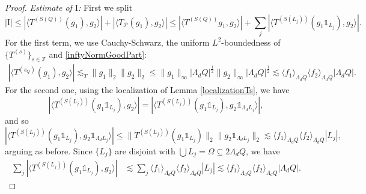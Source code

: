 \documentclass[12pt]{amsart}
\newcommand{\Z}{\mathbb{Z}}
\newcommand{\one}{\mathds{1}}
\theoremstyle{plain}
\theoremstyle{definition} %
\numberwithin{equation}{section}
\begin{document}
\begin{proof}
\noindent \textit{Estimate of $\mathrm{I}$:} First we split
\[
    |\mathrm{I}|
    \leq
    |\langle T^{(S(Q))}(g_1),g_2\rangle|
    +
    |\langle T_{\mathcal{P}}(g_1),g_2\rangle|
    \leq 
    |\langle T^{(S(Q))}g_1,g_2\rangle|
    +
    \sum_{j}|\langle T^{(S(L_j))}(g_1\one_{L_j}),g_2\rangle|.
\]
For the first term, we use Cauchy-Schwarz, the uniform $L^2$-boundedness of $\{T^{(s)}\}_{s\in\Z}$ and \eqref{inftyNormGoodPart}:
\begin{align*}
|\langle T^{(s_Q)}(g_1),g_2\rangle|
\lesssim_{T}
\|g_1\|_2\|g_2\|_2 
\leq
\|g_1\|_{\infty}|\Lambda_dQ|^{\frac{1}{2}} \|g_2\|_{\infty}|\Lambda_dQ|^{\frac{1}{2}}
\lesssim
\langle f_1\rangle_{\Lambda_dQ}\langle f_2\rangle_{\Lambda_dQ}|\Lambda_dQ|.
\end{align*}
    For the second one, using the localization of Lemma \ref{localizationTs}, we have
    \[
    |\langle T^{(S(L_j))}(g_1\one_{L_j}),g_2\rangle|
    =%
    |\langle T^{(S(L_j))}(g_1\one_{L_j}),g_2\one_{\Lambda_dL_j}\rangle|,
    \]
    and so
    \[
    |\langle T^{(S(L_j))}(g_1\one_{L_j}),g_2\one_{\Lambda_dL_j}\rangle|
    \leq
    \|T^{(S(L_j))}(g_1\one_{L_j})\|_{2}\|g_2\one_{\Lambda_dL_j}\|_{2}
    \lesssim 
    \langle f_1\rangle_{\Lambda_dQ}\langle f_2\rangle_{\Lambda_dQ}|L_j|,
    \]
    arguing as before. Since $\{L_j\}$ are disjoint with $\bigcup L_j=\Omega\subseteq 2\Lambda_dQ$, we have
    \begin{align*}
        \sum_{j}|\langle T^{(S(L_j))}(g_1\one_{L_j}),g_2\rangle|
        &\lesssim 
        \sum_{j}\langle f_1\rangle_{\Lambda_dQ}\langle f_2\rangle_{\Lambda_dQ}|L_j|
        \lesssim
        \langle f_1\rangle_{\Lambda_dQ}\langle f_2\rangle_{\Lambda_dQ}|\Lambda_dQ|.
    \end{align*}


\end{proof}
\end{document}
